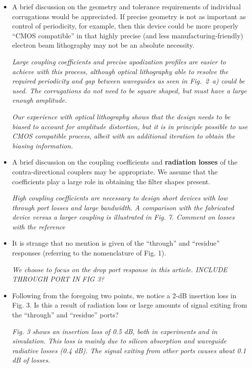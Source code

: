 \documentclass[]{article}
\begin{document}
\begin{itemize}
\item A brief discussion on the geometry and tolerance requirements of individual corrugations would be appreciated. If precise geometry is not as important as control of periodicity, for example, then this device could be more properly “CMOS compatible” in that highly precise (and less manufacturing-friendly) electron beam lithography may not be an absolute necessity.

\emph{Large coupling coefficients and precise apodization profiles are easier to achieve with this process, although optical lithography able to resolve the required periodicity and gap between waveguides as seen in Fig.~2~a) could be used. The corrugations do not need to be square shaped, but must have a large enough amplitude.} 
	
\emph{Our experience with optical lithography shows that the design needs to be biased to account for amplitude distortion, but it is in principle possible to use CMOS compatible process, albeit with an additional iteration to obtain the biasing information.}

\item A brief discussion on the coupling coefficients and \textbf{radiation losses} of the contra-directional couplers may be appropriate. We assume that the coefficients play a large role in obtaining the filter shapes present.

\emph{High coupling coefficients are necessary to design short devices with low through port losses and large bandwidth. A comparison with the fabricated device versus a larger coupling is illustrated in Fig. 7. Comment on losses with the reference \cite{caverley2015measurement}}

\item It is strange that no mention is given of the “through” and “residue” responses (referring to the nomenclature of Fig. 1).

\emph{We choose to focus on the drop port response in this article. INCLUDE THROUGH PORT IN FIG 3?}

\item Following from the foregoing two points, we notice a 2-dB insertion loss in Fig. 3. Is this a result of radiation loss or large amounts of signal exiting from the “through” and “residue” ports?

\emph{Fig. 3 shows an insertion loss of 0.5 dB, both in experiments and in simulation. This loss is  mainly due to silicon absorption and waveguide radiative losses (0.4 dB). The signal exiting from other ports causes about 0.1 dB of losses.}


\end{itemize}
\end{document}
